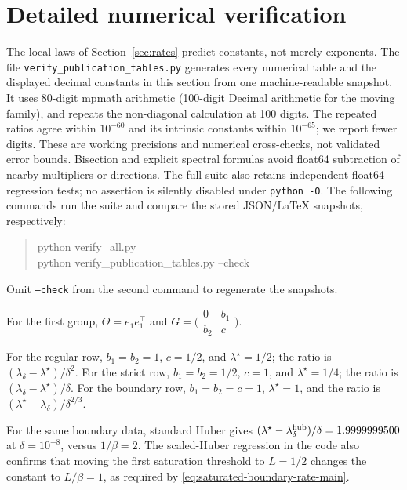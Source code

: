 \section{Detailed numerical verification}
\label{sec:supp-numerics}

The local laws of Section~\ref{sec:rates} predict constants, not merely
exponents.  The file \nolinkurl{verify_publication_tables.py} generates every
numerical table and the displayed decimal constants in this section from one
machine-readable snapshot.  It uses 80-digit mpmath arithmetic (100-digit
Decimal arithmetic for the moving family), and repeats the non-diagonal
calculation at 100 digits.  The repeated ratios agree within \(10^{-60}\)
and its intrinsic constants within \(10^{-65}\); we report fewer digits.
These are working precisions and numerical cross-checks, not validated
error bounds.  Bisection and explicit spectral formulas avoid float64
subtraction of nearby multipliers or directions.  The full suite also retains
independent float64 regression tests; no assertion is silently disabled under
\texttt{python -O}.  The following commands run the suite and compare the
stored JSON/LaTeX snapshots, respectively:
\begin{quote}\small\ttfamily
python verify\_all.py\\
python verify\_publication\_tables.py --check
\end{quote}
Omit \texttt{--check} from the second command to regenerate the snapshots.

For the first group, \(\Theta=e_1e_1^\top\) and
\(G=\bigl(\begin{smallmatrix}0&b_1\\b_2&c\end{smallmatrix}\bigr)\).

For the regular row, \(b_1=b_2=1\), \(c=1/2\), and
\(\lambda^\star=1/2\); the ratio is
\((\lambda_\delta-\lambda^\star)/\delta^2\).  For the strict row,
\(b_1=b_2=1/2\), \(c=1\), and \(\lambda^\star=1/4\); the ratio is
\((\lambda_\delta-\lambda^\star)/\delta\).  For the boundary row,
\(b_1=b_2=c=1\), \(\lambda^\star=1\), and the ratio is
\((\lambda^\star-\lambda_\delta)/\delta^{2/3}\).


For the same boundary data, standard Huber gives
\((\lambda^\star-\lambda_\delta^{\rm hub})/\delta=1.9999999500\) at
\(\delta=10^{-8}\), versus \(1/\beta=2\).  The scaled-Huber regression in
the code also confirms that moving the first saturation threshold to
\(L=1/2\) changes the constant to \(L/\beta=1\), as required by
\eqref{eq:saturated-boundary-rate-main}.

